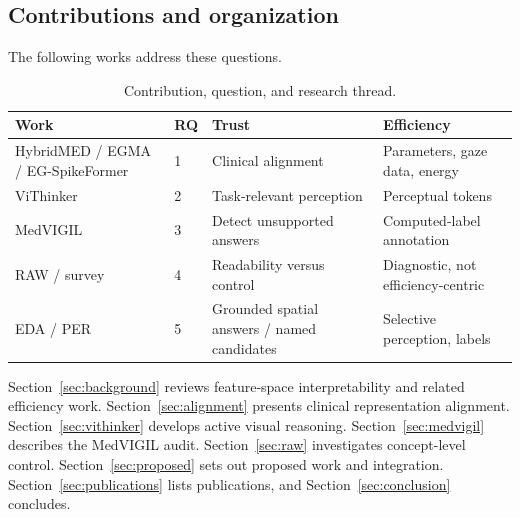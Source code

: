 \subsection{Contributions and organization}
The following works address these questions.
\begin{table}[htbp]\centering\small
\caption{Contribution, question, and research thread.}
\begin{tabularx}{\textwidth}{l l Y Y}\toprule
Work & RQ & Trust & Efficiency \\\midrule
HybridMED / EGMA / EG-SpikeFormer & 1 & Clinical alignment & Parameters, gaze data, energy \\
ViThinker & 2 & Task-relevant perception & Perceptual tokens \\
MedVIGIL & 3 & Detect unsupported answers & Computed-label annotation \\
RAW / survey & 4 & Readability versus control & Diagnostic, not efficiency-centric \\
EDA / PER & 5 & Grounded spatial answers / named candidates & Selective perception, labels \\\bottomrule
\end{tabularx}\end{table}
Section~\ref{sec:background} reviews feature-space interpretability and related efficiency work. Section~\ref{sec:alignment} presents clinical representation alignment. Section~\ref{sec:vithinker} develops active visual reasoning. Section~\ref{sec:medvigil} describes the MedVIGIL audit. Section~\ref{sec:raw} investigates concept-level control. Section~\ref{sec:proposed} sets out proposed work and integration. Section~\ref{sec:publications} lists publications, and Section~\ref{sec:conclusion} concludes.
